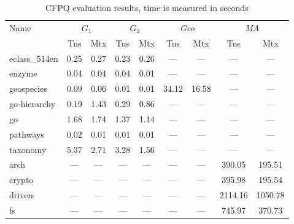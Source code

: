 {\setlength{\tabcolsep}{0.2em}
  \begin{table}
    \centering
    \caption{CFPQ evaluation results, time is measured in seconds}
    \label{tbl:CFPQ_index}
    \small
    \begin{tabular}{| l | c | c | c | c | c | c | c | c |}
      \hline

      \multirow{2}{*}{Name}  & \multicolumn{2}{c|}{$G_1$} & \multicolumn{2}{c|}{$G_2$} & \multicolumn{2}{c|}{\textit{Geo}} & \multicolumn{2}{c|}{\textit{MA}}\\
      \cline{2-9}
                      & Tns    & Mtx    & Tns  & Mtx  & Tns   & Mtx   & Tns     & Mtx \\
      \hline
      \hline
      eclass\_514en   & 0.25   & 0.27   & 0.23 & 0.26 & ---   & ---   & ---     & ---\\
      enzyme          & 0.04   & 0.04   & 0.04 & 0.01 & ---   & ---   & ---     & ---\\
      geospecies      & 0.09   & 0.06   & 0.01 & 0.01 & 34.12 & 16.58 & ---     & ---\\
      go-hierarchy    & 0.19   & 1.43   & 0.29 & 0.86 & ---   & ---   & ---     & ---\\
      go              & 1.68   & 1.74   & 1.37 & 1.14 & ---   & ---   & ---     & ---\\
      pathways        & 0.02   & 0.01   & 0.01 & 0.01 & ---   & ---   & ---     & ---\\
      taxonomy        & 5.37   & 2.71   & 3.28 & 1.56 & ---   & ---   & ---     & ---\\
      \hline
      arch            & ---    & ---    & ---  & ---  & ---   & ---   & 390.05  & 195.51  \\
      crypto          & ---    & ---    & ---  & ---  & ---   & ---   & 395.98  & 195.54  \\
      drivers         & ---    & ---    & ---  & ---  & ---   & ---   & 2114.16 & 1050.78 \\
      fs              & ---    & ---    & ---  & ---  & ---   & ---   & 745.97  & 370.73  \\
      \hline
    \end{tabular}
  \end{table}
}

